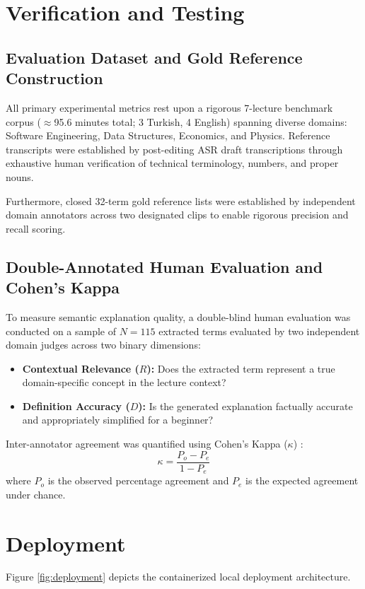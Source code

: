 \documentclass[a4paper,12pt]{report}
\begin{document}
\section{Verification and Testing}

\subsection{Evaluation Dataset and Gold Reference Construction}
All primary experimental metrics rest upon a rigorous 7-lecture benchmark corpus ($\approx$95.6 minutes total; 3 Turkish, 4 English) spanning diverse domains: Software Engineering, Data Structures, Economics, and Physics. Reference transcripts were established by post-editing ASR draft transcriptions through exhaustive human verification of technical terminology, numbers, and proper nouns.

Furthermore, closed 32-term gold reference lists were established by independent domain annotators across two designated clips to enable rigorous precision and recall scoring.

\subsection{Double-Annotated Human Evaluation and Cohen's Kappa}
To measure semantic explanation quality, a double-blind human evaluation was conducted on a sample of $N=115$ extracted terms evaluated by two independent domain judges across two binary dimensions:
\begin{itemize}
    \item \textbf{Contextual Relevance ($R$):} Does the extracted term represent a true domain-specific concept in the lecture context?
    \item \textbf{Definition Accuracy ($D$):} Is the generated explanation factually accurate and appropriately simplified for a beginner?
\end{itemize}

Inter-annotator agreement was quantified using Cohen's Kappa ($\kappa$) \cite{cohen1960}:
\begin{equation}
\kappa = \frac{P_o - P_e}{1 - P_e}
\end{equation}
where $P_o$ is the observed percentage agreement and $P_e$ is the expected agreement under chance.

\section{Deployment}
Figure \ref{fig:deployment} depicts the containerized local deployment architecture.
\end{document}
